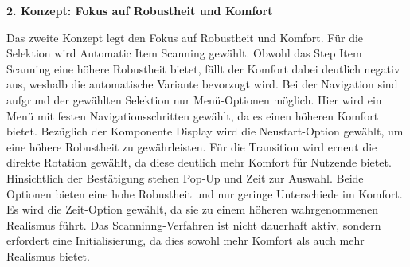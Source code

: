 {\normalfont \bfseries 2. Konzept: Fokus auf Robustheit und Komfort}

Das zweite Konzept legt den Fokus auf Robustheit und Komfort. Für die Selektion wird Automatic Item Scanning gewählt. Obwohl das Step Item Scanning eine höhere Robustheit bietet, fällt der Komfort dabei deutlich negativ aus, weshalb die automatische Variante bevorzugt wird. Bei der Navigation sind aufgrund der gewählten Selektion nur Menü-Optionen möglich. Hier wird ein Menü mit festen Navigationsschritten gewählt, da es einen höheren Komfort bietet. Bezüglich der Komponente Display wird die Neustart-Option gewählt, um eine höhere Robustheit zu gewährleisten. Für die Transition wird erneut die direkte Rotation gewählt, da diese deutlich mehr Komfort für Nutzende bietet. Hinsichtlich der Bestätigung stehen Pop-Up und Zeit zur Auswahl. Beide Optionen bieten eine hohe Robustheit und nur geringe Unterschiede im Komfort. Es wird die Zeit-Option gewählt, da sie zu einem höheren wahrgenommenen Realismus führt. Das Scanninng-Verfahren ist nicht dauerhaft aktiv, sondern erfordert eine Initialisierung, da dies sowohl mehr Komfort als auch mehr Realismus bietet.
